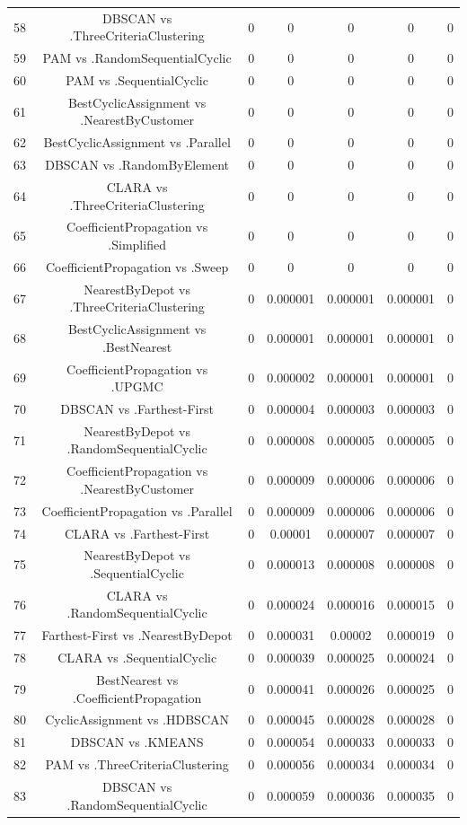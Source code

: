 \documentclass[a4paper,10pt]{article}
\begin{document}
\begin{landscape}
\begin{table}[!htp]
\begin{tabular}{ccccccc}
58&DBSCAN vs .ThreeCriteriaClustering&0&0&0&0&0\\
59&PAM vs .RandomSequentialCyclic&0&0&0&0&0\\
60&PAM vs .SequentialCyclic&0&0&0&0&0\\
61&BestCyclicAssignment vs .NearestByCustomer&0&0&0&0&0\\
62&BestCyclicAssignment vs .Parallel&0&0&0&0&0\\
63&DBSCAN vs .RandomByElement&0&0&0&0&0\\
64&CLARA vs .ThreeCriteriaClustering&0&0&0&0&0\\
65&CoefficientPropagation vs .Simplified&0&0&0&0&0\\
66&CoefficientPropagation vs .Sweep&0&0&0&0&0\\
67&NearestByDepot vs .ThreeCriteriaClustering&0&0.000001&0.000001&0.000001&0\\
68&BestCyclicAssignment vs .BestNearest&0&0.000001&0.000001&0.000001&0\\
69&CoefficientPropagation vs .UPGMC&0&0.000002&0.000001&0.000001&0\\
70&DBSCAN vs .Farthest-First&0&0.000004&0.000003&0.000003&0\\
71&NearestByDepot vs .RandomSequentialCyclic&0&0.000008&0.000005&0.000005&0\\
72&CoefficientPropagation vs .NearestByCustomer&0&0.000009&0.000006&0.000006&0\\
73&CoefficientPropagation vs .Parallel&0&0.000009&0.000006&0.000006&0\\
74&CLARA vs .Farthest-First&0&0.00001&0.000007&0.000007&0\\
75&NearestByDepot vs .SequentialCyclic&0&0.000013&0.000008&0.000008&0\\
76&CLARA vs .RandomSequentialCyclic&0&0.000024&0.000016&0.000015&0\\
77&Farthest-First vs .NearestByDepot&0&0.000031&0.00002&0.000019&0\\
78&CLARA vs .SequentialCyclic&0&0.000039&0.000025&0.000024&0\\
79&BestNearest vs .CoefficientPropagation&0&0.000041&0.000026&0.000025&0\\
80&CyclicAssignment vs .HDBSCAN&0&0.000045&0.000028&0.000028&0\\
81&DBSCAN vs .KMEANS&0&0.000054&0.000033&0.000033&0\\
82&PAM vs .ThreeCriteriaClustering&0&0.000056&0.000034&0.000034&0\\
83&DBSCAN vs .RandomSequentialCyclic&0&0.000059&0.000036&0.000035&0\\

\end{tabular}
\end{table}
\end{landscape}
\end{document}
